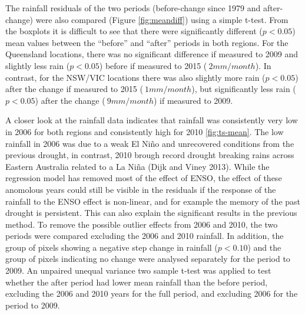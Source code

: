 \documentclass[]{elsarticle} %
\theoremstyle{definition}
\theoremstyle{definition}
\theoremstyle{definition}
\theoremstyle{remark}
\begin{document}
The rainfall residuals of the two periods (before-change since 1979 and
after-change) were also compared (Figure \ref{fig:meandiff}) using a
simple t-test. From the boxplots it is difficult to see that there were
significantly different (\(p < 0.05\)) mean values between the
``before'' and ``after'' periods in both regions. For the Queensland
locations, there was no significant difference if measured to 2009 and
slightly less rain (\(p < 0.05\)) before if measured to 2015
(\(~ 2 mm/month\)). In contrast, for the NSW/VIC locations there was
also slightly more rain (\(p < 0.05\)) after the change if measured to
2015 (\(~ 1 mm/month\)), but significantly less rain (\(p < 0.05\))
after the change (\(~ 9 mm/month\)) if measured to 2009.

A closer look at the rainfall data indicates that rainfall was
consistently very low in 2006 for both regions and consistently high for
2010 \ref{fig:ts-mean}. The low rainfall in 2006 was due to a weak El
Niño and unrecovered conditions from the previous drought, in contrast,
2010 brough record drought breaking rains across Eastern Australia
related to a La Niña (Dijk and Viney 2013). While the regression model
has removed most of the effect of ENSO, the effect of these anomolous
years could still be visible in the residuals if the response of the
rainfall to the ENSO effect is non-linear, and for example the memory of
the past drought is persistent. This can also explain the significant
results in the previous method. To remove the possible outlier effects
from 2006 and 2010, the two periods were compared excluding the 2006 and
2010 rainfall. In addition, the group of pixels showing a negative step
change in rainfall (\(p < 0.10\)) and the group of pixels indicating no
change were analysed separately for the period to 2009. An unpaired
unequal variance two sample t-test was applied to test whether the after
period had lower mean rainfall than the before period, excluding the
2006 and 2010 years for the full period, and excluding 2006 for the
period to 2009.
\end{document}
